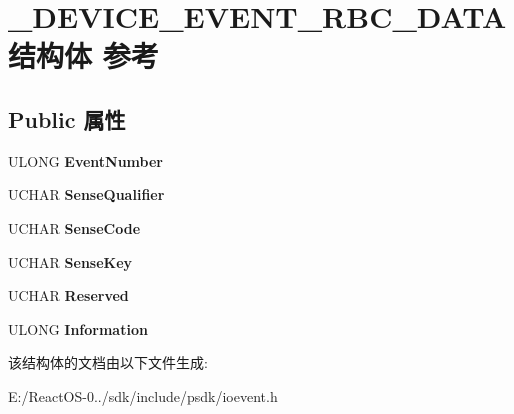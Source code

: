 \hypertarget{struct___d_e_v_i_c_e___e_v_e_n_t___r_b_c___d_a_t_a}{}\section{\+\_\+\+D\+E\+V\+I\+C\+E\+\_\+\+E\+V\+E\+N\+T\+\_\+\+R\+B\+C\+\_\+\+D\+A\+T\+A结构体 参考}
\label{struct___d_e_v_i_c_e___e_v_e_n_t___r_b_c___d_a_t_a}
\subsection*{Public 属性}
\begin{DoxyCompactItemize}
\item 
\mbox{\label{struct___d_e_v_i_c_e___e_v_e_n_t___r_b_c___d_a_t_a_a7fb4528d4884b68f60aa9621b7b0788a}} 
U\+L\+O\+NG {\bfseries Event\+Number}
\item 
\mbox{\label{struct___d_e_v_i_c_e___e_v_e_n_t___r_b_c___d_a_t_a_a97bfe1cb667af3d11baf85ef5b5e4e22}} 
U\+C\+H\+AR {\bfseries Sense\+Qualifier}
\item 
\mbox{\label{struct___d_e_v_i_c_e___e_v_e_n_t___r_b_c___d_a_t_a_ac6616729ff7725445181da0291b8dfff}} 
U\+C\+H\+AR {\bfseries Sense\+Code}
\item 
\mbox{\label{struct___d_e_v_i_c_e___e_v_e_n_t___r_b_c___d_a_t_a_a48199535ca9c54376451347f958f9c22}} 
U\+C\+H\+AR {\bfseries Sense\+Key}
\item 
\mbox{\label{struct___d_e_v_i_c_e___e_v_e_n_t___r_b_c___d_a_t_a_a14c05d69d8fbad05e32a80d40388c87c}} 
U\+C\+H\+AR {\bfseries Reserved}
\item 
\mbox{\label{struct___d_e_v_i_c_e___e_v_e_n_t___r_b_c___d_a_t_a_a2baf4dd62bc264e3b78d66b20efb338c}} 
U\+L\+O\+NG {\bfseries Information}
\end{DoxyCompactItemize}


该结构体的文档由以下文件生成\+:\begin{DoxyCompactItemize}
\item 
E\+:/\+React\+O\+S-\/0../sdk/include/psdk/ioevent.\+h\end{DoxyCompactItemize}
